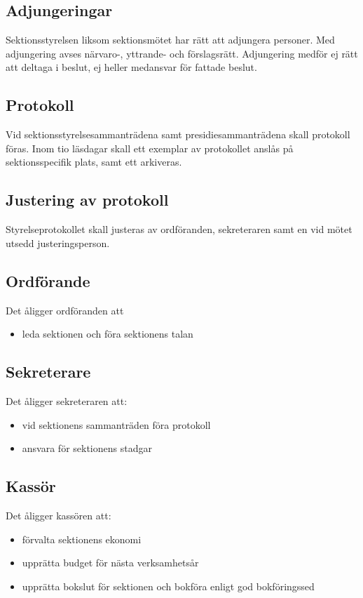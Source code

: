 \documentclass{datateknologsektionen-document}
\begin{document}
    \subsection{Adjungeringar}
      Sektionsstyrelsen liksom sektionsmötet har rätt att adjungera personer. Med adjungering
      avses närvaro-, yttrande- och förslagsrätt. Adjungering medför ej rätt att deltaga i beslut,
      ej heller medansvar för fattade beslut.
    \subsection{Protokoll}
      Vid sektionsstyrelsesammanträdena samt presidiesammanträdena skall protokoll föras.
      Inom tio läsdagar skall ett exemplar av protokollet anslås på sektionsspecifik plats, samt
      ett arkiveras.
    \subsection{Justering av protokoll}
      Styrelseprotokollet skall justeras av ordföranden, sekreteraren samt en vid mötet utsedd
      justeringsperson.
    \subsection{Ordförande}
      Det åligger ordföranden att
      \begin{itemize}
        \item leda sektionen och föra sektionens talan
      \end{itemize}
      
    \subsection{Sekreterare}
      Det åligger sekreteraren att:
      \begin{itemize}
        \item vid sektionens sammanträden föra protokoll
        \item ansvara för sektionens stadgar
      \end{itemize}
     
    \subsection{Kassör}
      Det åligger kassören att:
      \begin{itemize}
        \item förvalta sektionens ekonomi
        \item upprätta budget för nästa verksamhetsår
        \item upprätta bokslut för sektionen och bokföra enligt god bokföringssed
      \end{itemize}
\end{document}
